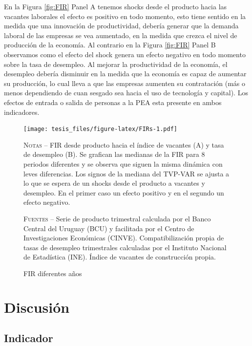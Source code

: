 \documentclass[12pt,oneside]{reedthesis}
\begin{document}
En la Figura \ref{fig:FIR} Panel A tenemos shocks desde el producto hacia las vacantes laborales el efecto es positivo en todo momento, esto tiene sentido en la medida que una innovación de productividad, debería generar que la demanda laboral de las empresas se vea aumentado, en la medida que crezca el nivel de producción de la economía. Al contrario en la Figura \ref{fig:FIR} Panel B observamos como el efecto del shock genera un efecto negativo en todo momento sobre la tasa de desempleo. Al mejorar la productividad de la economía, el desempleo debería disminuir en la medida que la economía es capaz de aumentar su producción, lo cual lleva a que las empresas aumenten su contratación (más o menos dependiendo de cuan sesgado sea hacia el uso de tecnología y capital). Los efectos de entrada o salida de personas a la PEA esta presente en ambos indicadores.
\begin{figure}
\texttt{[image: tesis\_files/figure-latex/FIRs-1.pdf]}
\caption{FIR diferentes años}\label{fig:FIRs}\textsc{}

\footnotesize\textsc{Notas} -- FIR desde producto hacia el índice de vacantes (A) y tasa de desempleo (B). Se grafican las medianas de la FIR para 8 periodos diferentes y se observa que siguen la misma dinámica con leves diferencias. Los signos de la mediana del TVP-VAR se ajusta a lo que se espera de un shocks desde el producto a vacantes y desempleo. En el primer caso un efecto positivo y en el segundo un efecto negativo.

\textsc{Fuentes} -- Serie de producto trimestral calculada por el Banco Central del Uruguay (BCU) y facilitada por el Centro de Investigaciones Económicas (CINVE). Compatibilización propia de tasas de desempleo trimestrales calculadas por el Instituto Nacional de Estadística (INE). Índice de vacantes de construcción propia.
\end{figure}
\hypertarget{cap:Discusion}{%
\chapter{Discusión}\label{cap:Discusion}}

\hypertarget{indicador}{%
\section{Indicador}\label{indicador}}
\end{document}
